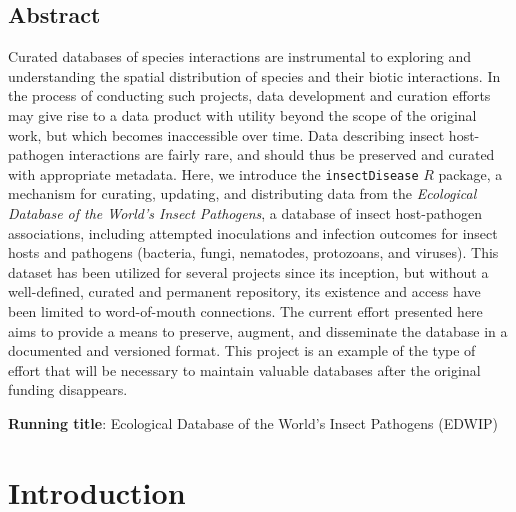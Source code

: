 \documentclass[12pt]{article}
\begin{document}
\subsection*{Abstract}
Curated databases of species interactions are instrumental to exploring and understanding the spatial distribution of species and their biotic interactions. In the process of conducting such projects, data development and curation efforts may give rise to a data product with utility beyond the scope of the original work, but which becomes inaccessible over time. Data describing insect host-pathogen interactions are fairly rare, and should thus be preserved and curated with appropriate metadata. Here, we introduce the \texttt{insectDisease} $R$ package, a mechanism for curating, updating, and distributing data from the \textit{Ecological Database of the World's Insect Pathogens}, a database of insect host-pathogen associations, including attempted inoculations and infection outcomes for insect hosts and pathogens (bacteria, fungi, nematodes, protozoans, and viruses). This dataset has been utilized for several projects since its inception, but without a well-defined, curated and permanent repository, its existence and access have been limited to word-of-mouth connections. The current effort presented here aims to provide a means to preserve, augment, and disseminate the database in a documented and versioned format. This project is an example of the type of effort that will be necessary to maintain valuable databases after the original funding disappears.







\medskip

\noindent \textbf{Running title}: Ecological Database of the World's Insect Pathogens (EDWIP)  \\







 




\clearpage


\section*{Introduction}
\end{document}
